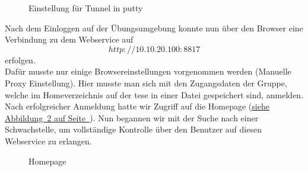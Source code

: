 \documentclass[12pt,a4paper,titlepage,oneside]{scrartcl}
\begin{document}
\begin{figure}[h!]
  \centering
  \caption{Einstellung für Tunnel in putty}
  \label{fig:logo2}
\end{figure}

Nach dem Einloggen auf der Übungsumgebung konnte nun über den Browser eine Verbindung zu dem Webservice auf $$http://10.10.20.100:8817$$ erfolgen.\\ Dafür musste nur einige Browsereinstellungen vorgenommen werden (Manuelle Proxy Einstellung). Hier musste man sich mit den Zugangsdaten der Gruppe, welche im Homeverzeichnis auf der tese in einer Datei gespeichert sind, anmelden.
Nach erfolgreicher Anmeldung hatte wir Zugriff auf die Homepage (\hyperref[fig:logo3]{siehe Abbildung~\ref*{fig:logo3} auf Seite~\pageref*{fig:logo3}}). Nun begannen wir mit der Suche nach einer Schwachstelle, um  vollständige Kontrolle über den Benutzer auf diesen Webservice zu erlangen.

\begin{figure}[h!]
  \centering
  \caption{Homepage}
  \label{fig:logo3}
\end{figure}
\end{document}
